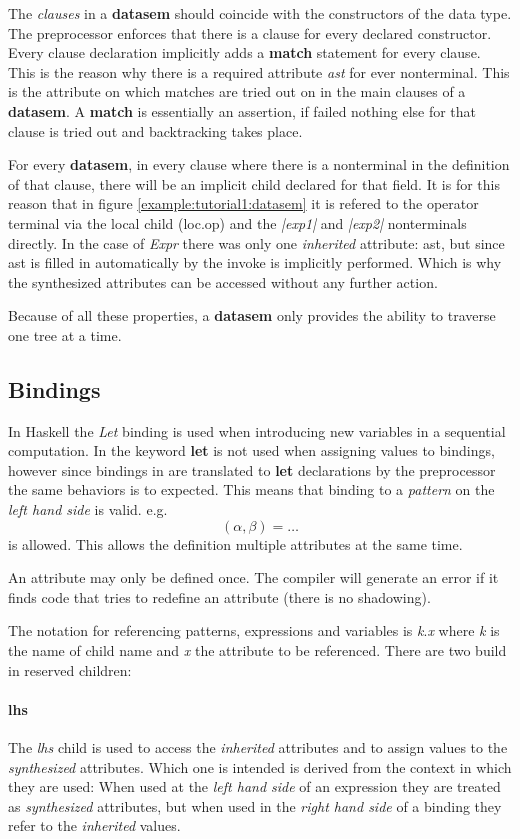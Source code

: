 The \emph{clauses} in a \textbf{datasem} should coincide with the constructors of the data type. The preprocessor enforces that there is a clause for every declared constructor. Every clause declaration implicitly adds a \textbf{match} statement for every clause. This is the reason why there is a required attribute \emph{ast} for ever nonterminal. This is the attribute on which matches are tried out on in the main clauses of a \textbf{datasem}. A \textbf{match} is essentially an assertion, if failed nothing else for that clause is tried out and backtracking takes place.

For every \textbf{datasem}, in every clause where there is a nonterminal in the definition of that clause, there will be an implicit child declared for that field. It is for this reason that in figure \ref{example:tutorial1:datasem} it is refered to the operator terminal via the local child (loc.op) and the \emph{|exp1|} and \emph{|exp2|} nonterminals directly. In the case of \emph{Expr} there was only one \emph{inherited} attribute: ast, but since ast is filled in automatically by \rcore the invoke is implicitly performed. Which is why the synthesized attributes can be accessed without any further action. 

Because of all these properties, a \textbf{datasem} only provides the ability to traverse one tree at a time.
\subsection{Bindings}
\label{bindings}
In Haskell the \emph{Let} binding is used when introducing new variables in a sequential computation. In \rcore the keyword \textbf{let} is not used when assigning values to bindings, however since bindings in \rcore are translated to \textbf{let} declarations by the preprocessor the same behaviors is to expected. This means that binding to a \emph{pattern} on the \emph{left hand side} is valid. e.g. \[ (\alpha, \beta) = \ldots \] is allowed. This allows the definition multiple attributes at the same time.

An attribute may only be defined once. The compiler will generate an error if it finds code that tries to redefine an attribute (there is no shadowing).

The notation for referencing patterns, expressions and variables is \emph{k}.\emph{x} where \emph{k} is the name of child name and \emph{x} the attribute to be referenced. There are two build in reserved children:

\paragraph{lhs}
The \emph{lhs} child is used to access the \emph{inherited} attributes and to assign values to the \emph{synthesized} attributes. Which one is intended is derived from the context in which they are used: When used at the \emph{left hand side} of an expression they are treated as \emph{synthesized} attributes, but when used in the \emph{right hand side} of a binding they refer to the \emph{inherited} values.
 
